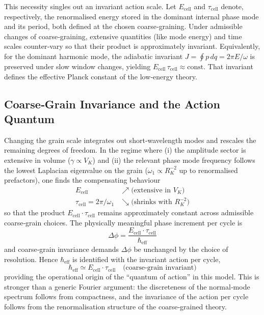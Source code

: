 \documentclass[11pt]{article}
\begin{document}
This necessity singles out an invariant action scale. Let $E_{\text{cell}}$ and $\tau_{\text{cell}}$ denote, respectively, the renormalised energy stored in the dominant internal phase mode and its period, both defined at the chosen coarse‑graining. Under admissible changes of coarse‑graining, extensive quantities (like mode energy) and time scales counter‑vary so that their product is approximately invariant. Equivalently, for the dominant harmonic mode, the adiabatic invariant $J=\oint p\,dq=2\pi E/\omega$ is preserved under slow window changes, yielding $E_{\text{cell}}\,\tau_{\text{cell}}\approx\text{const}$. That invariant defines the effective Planck constant of the low‑energy theory.

\subsection{Coarse‑Grain Invariance and the Action Quantum}

Changing the grain scale integrates out short‑wavelength modes and rescales the remaining degrees of freedom. In the regime where (i) the amplitude sector is extensive in volume ($\gamma \propto V_K$) and (ii) the relevant phase mode frequency follows the lowest Laplacian eigenvalue on the grain ($\omega_1 \propto R_K^{-2}$ up to renormalised prefactors), one finds the compensating behaviour
\begin{align}
E_{\text{cell}} &\nearrow \text{(extensive in } V_K\text{)}\\
\tau_{\text{cell}} = 2\pi/\omega_1 &\searrow \text{(shrinks with } R_K^{-2}\text{)}
\end{align}
so that the product $E_{\text{cell}} \cdot \tau_{\text{cell}}$ remains approximately constant across admissible coarse‑grain choices. The physically meaningful phase increment per cycle is
\begin{equation}
\Delta\phi = \frac{E_{\text{cell}} \cdot \tau_{\text{cell}}}{\hbar_{\mathrm{eff}}}
\end{equation}
and coarse‑grain invariance demands $\Delta\phi$ be unchanged by the choice of resolution. Hence $\hbar_{\mathrm{eff}}$ is identified with the invariant action per cycle,
\begin{equation}
\hbar_{\mathrm{eff}} \simeq E_{\text{cell}} \cdot \tau_{\text{cell}} \quad \text{(coarse‑grain invariant)}
\end{equation}
providing the operational origin of the ``quantum of action'' in this model. This is stronger than a generic Fourier argument: the discreteness of the normal‑mode spectrum follows from compactness, and the invariance of the action per cycle follows from the renormalisation structure of the coarse‑grained theory.
\end{document}
